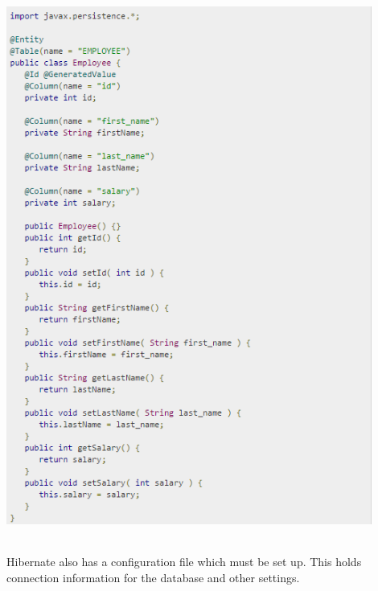\begin{center}    
	\includegraphics[height=18cm, width=12cm]{img/hibernateclass.png}
\end{center}

Hibernate also has a configuration file which must be set up. This holds connection information for the database and other settings.


